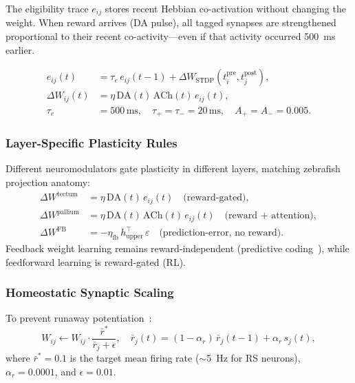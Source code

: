\documentclass[11pt,a4paper]{article}
\begin{document}
The eligibility trace $e_{ij}$ stores recent Hebbian co-activation
without changing the weight.
When reward arrives (DA pulse), all tagged synapses are strengthened
proportional to their recent co-activity---even if that activity
occurred 500~ms earlier.

\begin{equation}\label{eq:three_factor}
\boxed{
\begin{aligned}
  e_{ij}(t) &= \tau_e\,e_{ij}(t{-}1) + \Delta W_\mathrm{STDP}(t_i^\mathrm{pre}, t_j^\mathrm{post}), \\
  \Delta W_{ij}(t) &= \eta\,\mathrm{DA}(t)\,\mathrm{ACh}(t)\,e_{ij}(t), \\
  \tau_e &= 500\,\mathrm{ms},\quad \tau_+ = \tau_- = 20\,\mathrm{ms},\quad A_+ = A_- = 0.005.
\end{aligned}
}
\end{equation}

\subsubsection{Layer-Specific Plasticity Rules}

Different neuromodulators gate plasticity in different layers,
matching zebrafish projection anatomy:
\begin{equation}\label{eq:neuromod_plasticity}
\begin{aligned}
  \Delta W^\mathrm{tectum}  &= \eta\,\mathrm{DA}(t)\,e_{ij}(t)
    \quad\text{(reward-gated)}, \\
  \Delta W^\mathrm{pallium} &= \eta\,\mathrm{DA}(t)\,\mathrm{ACh}(t)\,e_{ij}(t)
    \quad\text{(reward + attention)}, \\
  \Delta W^\mathrm{FB}      &= -\eta_\mathrm{fb}\,h_\mathrm{upper}^\top\,\varepsilon
    \quad\text{(prediction-error, no reward)}.
\end{aligned}
\end{equation}
Feedback weight learning remains reward-independent (predictive
coding~\cite{rao1999}), while feedforward learning is reward-gated (RL).

\subsubsection{Homeostatic Synaptic Scaling}

To prevent runaway potentiation~\cite{turrigiano2008}:
\begin{equation}\label{eq:hom_scaling}
  W_{ij} \leftarrow W_{ij} \cdot \frac{\bar{r}^*}{\bar{r}_j + \epsilon},
  \quad
  \bar{r}_j(t) = (1-\alpha_r)\,\bar{r}_j(t{-}1) + \alpha_r\,s_j(t),
\end{equation}
where $\bar{r}^* = 0.1$ is the target mean firing rate ($\sim$5~Hz
for RS neurons), $\alpha_r = 0.0001$, and $\epsilon = 0.01$.
\end{document}
